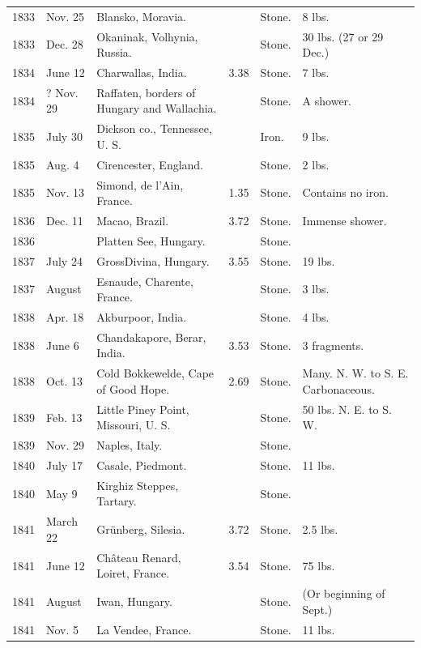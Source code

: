 \documentclass[a4paper, 12pt, oneside]{article}
\begin{document}
\begin{center}
\begin{longtable}{|p{10mm}|p{15mm}|p{32mm}|p{13mm}|p{13mm}|p{26mm}|}
        1833 & Nov. 25 & Blansko, Moravia. & ~ & Stone. & 8 lbs. \\
        1833 & Dec. 28 & Okaninak, Volhynia, Russia. & ~ & Stone. & 30 lbs. (27 or 29 Dec.) \\
        1834 & June 12 & Charwallas, India. & 3.38 & Stone. & 7 lbs. \\
        1834 & ? Nov. 29 & Raffaten, borders of Hungary and Wallachia. & ~ & Stone. & A shower. \\
        1835 & July 30 & Dickson co., Tennessee, U. S. & ~ & Iron. & 9 lbs. \\
        1835 & Aug. 4 & Cirencester, England. & ~ & Stone. & 2 lbs. \\
        1835 & Nov. 13 & Simond, de l’Ain, France. & 1.35 & Stone. & Contains no iron. \\
        1836 & Dec. 11 & Macao, Brazil. & 3.72 & Stone. & Immense shower. \\
        1836 & ~ & Platten See, Hungary. & ~ & Stone. & ~ \\
        1837 & July 24 & Gross\-Divina, Hungary. & 3.55 & Stone. & 19 lbs. \\
        1837 & August & Esnaude, Charente, France. & ~ & Stone. & 3 lbs. \\
        1838 & Apr. 18 & Akburpoor, India. & ~ & Stone. & 4 lbs. \\
        1838 & June 6 & Chandakapore, Berar, India. & 3.53 & Stone. & 3 fragments. \\
        1838 & Oct. 13 & Cold Bokkewelde, Cape of Good Hope. & 2.69 & Stone. & Many. N. W. to S. E. Carbonaceous. \\
        1839 & Feb. 13 & Little Piney Point, Missouri, U. S. & ~ & Stone. & 50 lbs. N. E. to S. W. \\
        1839 & Nov. 29 & Naples, Italy. & ~ & Stone. & ~ \\
        1840 & July 17 & Casale, Piedmont. & ~ & Stone. & 11 lbs. \\
        1840 & May 9 & Kirghiz Steppes, Tartary. & ~ & Stone. & ~ \\
        1841 & March 22 & Grünberg, Silesia. & 3.72 & Stone. & 2.5 lbs. \\
        1841 & June 12 & Château Renard, Loiret, France. & 3.54 & Stone. & 75 lbs. \\
        1841 & August & Iwan, Hungary. & ~ & Stone. & (Or beginning of Sept.) \\
        1841 & Nov. 5 & La Vendee, France. & ~ & Stone. & 11 lbs. \\

\end{longtable}
\end{center}
\end{document}
